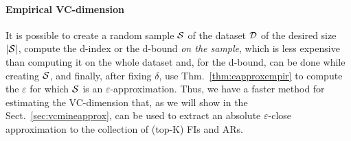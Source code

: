 \paragraph{Empirical VC-dimension} 
It is possible to create a random sample ${\cal S}$ of the dataset
${\cal D}$ of the desired size $|{\cal S}|$, compute the d-index or the d-bound \emph{on
the sample}, which is less expensive than computing it on the
whole dataset and, for the d-bound, can be done while creating ${\cal S}$, and
finally, after fixing $\delta$, use Thm.~\ref{thm:eapproxempir} to compute the
$\varepsilon$ for which ${\cal S}$ is an $\varepsilon$-approximation. Thus, 
we have a faster method for estimating the VC-dimension that, 
as we will show in the Sect.~\ref{sec:vcmineapprox}, can be used to extract an absolute
$\varepsilon$-close approximation to the collection of (top-K) FIs and ARs.


